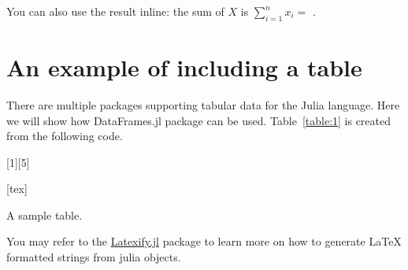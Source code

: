 \documentclass[11pt]{article}
\begin{document}
You can also use the result inline: the sum of $X$ is $\sum_{i=1}^nx_i=$ .

\section{An example of including a table}
There are multiple packages supporting tabular data for the Julia language.
Here we will show how DataFrames.jl package can be used.
Table~\ref{table:1} is created from the following code.

[1][5]
\begin{table}[H]
  \centering
  [tex]
  \caption{A sample table.}
\label{table:1}
\end{table}

You may refer to the \href{https://github.com/korsbo/Latexify.jl}{Latexify.jl} package to learn more on how to generate LaTeX formatted strings from julia objects.
\end{document}
